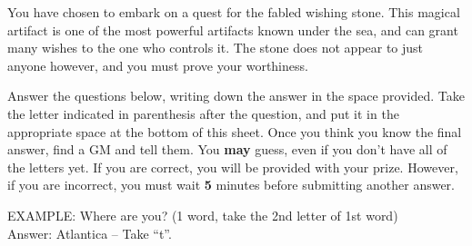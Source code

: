 \documentclass[green]{NeptuneBall}
\begin{document}
\name{\gWS{}}

You have chosen to embark on a quest for the fabled wishing stone. This magical artifact is one of the most powerful artifacts known under the sea, and can grant many wishes to the one who controls it. The stone does not appear to just anyone however, and you must prove your worthiness.

Answer the questions below, writing down the answer in the space provided. Take the letter indicated in parenthesis after the question, and put it in the appropriate space at the bottom of this sheet. Once you think you know the final answer, find a GM and tell them. You {\bf may} guess, even if you don't have all of the letters yet. If you are correct, you will be provided with your prize. However, if you are incorrect, you must wait {\bf 5} minutes before submitting another answer.

EXAMPLE:
Where are you? (1 word, take the 2nd letter of 1st word)\\
Answer: Atlantica  -- Take ``t''.
		
\end{document}
